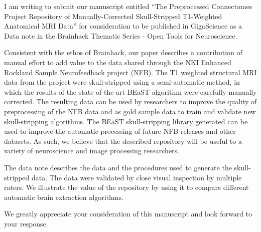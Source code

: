 \documentclass{article}
\begin{document}
\sffamily

I am writing to submit our manuscript entitled ``The Preprocessed Connectomes Project Repository of Manually-Corrected Skull-Stripped T1-Weighted Anatomical MRI Data'' for consideration to be published in GigaScience as a Data note in the Brainhack Thematic Series - Open Tools for Neuroscience.

Consistent with the ethos of Brainhack, our paper describes a contribution of manual effort to add value to the data shared through the NKI Enhanced Rockland Sample Neurofeedback project (NFB). The T1 weighted structural MRI data from the project were skull-stripped using a semi-automatic method, in which the results of the state-of-the-art BEaST algorithm were carefully manually corrected. The resulting data can be used by researchers to improve the quality of preprocessing of the NFB data and as gold sample data to train and validate new skull-stripping algorithms. The BEaST skull-stripping library generated can be used to improve the automatic processing of future NFB releases and other datasets. As such, we believe that the described repository will be useful to a variety of neuroscience and image processing researchers.

The data note describes the data and the procedures used to generate the skull-stripped data. The data were validated by close visual inspection by multiple raters. We illustrate the value of the repository by using it to compare different automatic brain extraction algorithms. 

We greatly appreciate your consideration of this manuscript and look forward to your response.
\end{document}
